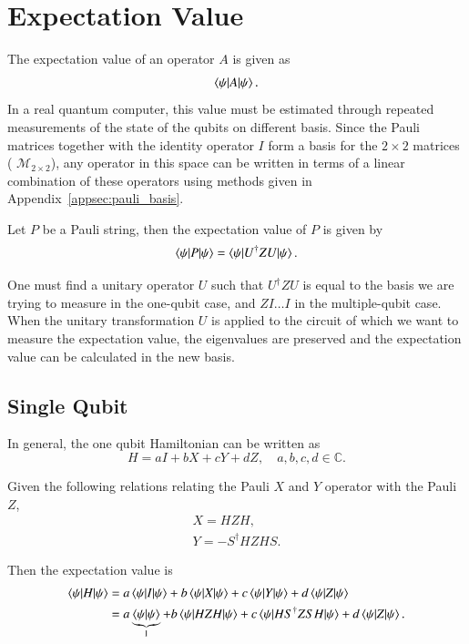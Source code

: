 \section{Expectation Value}
\label{sec:expectation}
The expectation value of an operator $ A $ is given as 
\[ \braket{\psi|A|\psi}. \]
In a real quantum computer, this value must be estimated through repeated measurements of the state of the qubits on different basis. Since the Pauli matrices together with the identity operator $ I $ form a basis for the $2 \times 2$ matrices ( $\mathcal{M}_{2\times 2}$), any operator in this space can be written in terms of a linear combination of these operators using methods given in Appendix~\ref{appsec:pauli_basis}.

Let $ P $ be a Pauli string, then the expectation value of $ P $ is given by
\begin{equation}
	\label{eq:expectation}
	\braket{\psi|P|\psi} = \braket{\psi|U^{\dagger}ZU|\psi}.
\end{equation}

One must find a unitary operator $ U $ such that $ U^{\dagger}ZU $ is equal to the basis we are trying to measure in the one-qubit case, and $ ZI\ldots I $ in the multiple-qubit case. When the unitary transformation $ U $ is applied to the circuit of which we want to measure the expectation value, the eigenvalues are preserved and the expectation value can be calculated in the new basis.

\subsection{Single Qubit}
\label{sub:single_qubit}
In general, the one qubit Hamiltonian can be written as 
\begin{equation}
	\label{eq:1qubit_hamiltonian}
	H = aI + bX + cY + dZ, \quad a,b,c,d \in \mathbb{C}. 
\end{equation}

Given the following relations relating the Pauli $ X $ and $ Y $ operator with the Pauli $ Z $,
\begin{align}
	\label{eq:basis-rotation}
	X = HZH, \\
	Y = -S^{\dagger}HZHS.
\end{align}

Then the expectation value is 
\begin{align}
	\braket{\psi|H|\psi} &= a\braket{\psi|I|\psi} + b \braket{\psi|X|\psi} + c \braket{\psi|Y|\psi} + d \braket{\psi|Z|\psi} \\
			     &= a \underbrace{\braket{\psi|\psi}}_{1} + b \braket{\psi|HZH|\psi} + c \braket{\psi|HS^{\dagger}ZSH|\psi} + d \braket{\psi|Z|\psi}.
\end{align}

